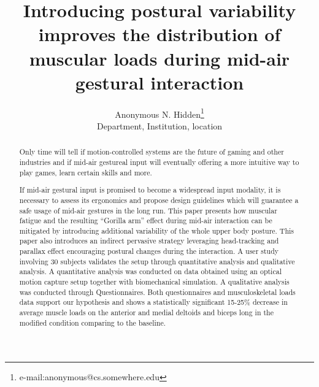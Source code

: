 \documentclass[tog]{acmsiggraph}
\title{Introducing postural variability improves the distribution of muscular loads during mid-air gestural interaction}
\author{
  Anonymous N. Hidden\thanks{e-mail:anonymous@cs.somewhere.edu}\\Department, Institution, location}
\begin{document}


\maketitle

\begin{abstract}


Only time will tell if motion-controlled systems are the future of gaming and other industries and if mid-air gestureal input will eventually offering a more intuitive way to play games, learn certain skills and more.

If mid-air gestural input is promised to become a widespread input modality, it is necessary to assess its ergonomics and propose design guidelines which will guarantee a safe usage of mid-air gestures in the long run. This paper presents how muscular fatigue and the resulting ``Gorilla arm'' effect during mid-air interaction can be mitigated by introducing additional variability of the whole upper body posture. This paper also introduces an indirect pervasive strategy leveraging head-tracking and parallax effect encouraging postural changes during the interaction. A user study involving 30 subjects validates the setup through quantitative analysis and qualitative analysis. A quantitative analysis was conducted on data obtained using an optical motion capture setup together with biomechanical simulation. A qualitative analysis was conducted through Questionnaires. Both questionnaires and musculoskeletal loads data support our hypothesis and shows a statistically significant 15-25\% decrease in average muscle loads on the anterior and medial deltoids and biceps long  in the modified condition comparing to the baseline.
\end{abstract}
\end{document}
